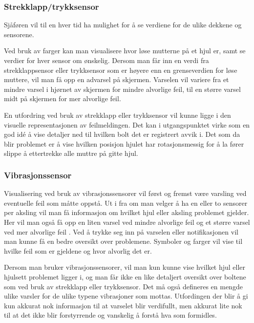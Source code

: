 \subsubsection{Strekklapp/trykksensor}
Sjåføren vil til en hver tid ha mulighet for å se verdiene for de ulike dekkene 
og sensorene. 

Ved bruk av farger kan man visualisere hvor løse mutterne på et hjul er, samt se 
verdier for hver sensor om ønskelig. Dersom man får inn en verdi fra 
strekklappsensor eller trykksensor som er høyere enn en grenseverdien for løse 
muttere, vil man få opp en advarsel på skjermen. Varselen vil variere fra et 
mindre varsel i hjørnet av skjermen for mindre alvorlige feil, til en 
større varsel midt på skjermen for mer alvorlige feil.

En utfordring ved bruk av strekklapp eller trykksensor vil kunne ligge i den 
visuelle representasjonen av feilmeldingen. Det kan i utgangspunktet virke som 
en god idé å vise detaljer ned til hvilken bolt det er registrert avvik i. Det 
som da blir problemet er å vise hvilken posisjon hjulet har rotasjonsmessig for 
å la fører slippe å ettertrekke alle muttre på gitte hjul.

\subsubsection{Vibrasjonssensor}
Visualisering ved bruk av vibrasjonssensorer vil først og fremst være varsling 
ved eventuelle feil som måtte oppstå. Ut i fra om man velger å ha en eller to 
sensorer per aksling vil man få informasjon om hvilket hjul eller aksling 
problemet gjelder. Her vil man også få opp en liten varsel ved mindre 
alvorlige feil og et større varsel ved mer alvorlige feil . Ved å trykke seg 
inn på varselen eller notifikasjonen vil man kunne få en bedre oversikt over 
problemene. Symboler og farger vil vise til hvilke feil som er gjeldene og hvor 
alvorlig det er.

Dersom man bruker vibrasjonssensorer, vil man kun kunne vise hvilket hjul eller 
hjulsett problemet ligger i, og man får ikke en like detaljert oversikt over 
boltene som ved bruk av strekklapp eller trykksensor. Det må også defineres 
en mengde ulike varsler for de ulike typene vibrasjoner som mottas. 
Utfordingen der blir å gi kun akkurat nok informasjon til at varselet blir 
verdifullt, men akkurat lite nok til at det ikke blir forstyrrende og vanskelig 
å forstå hva som formidles.